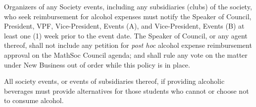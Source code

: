 Organizers of any Society events, including any subsidiaries (clubs) of the society,  who seek reimbursement for alcohol expenses must notify the Speaker of Council, President, VPF, Vice-President, Events (A), and Vice-President, Events (B) at least one (1) week prior to the event date. The Speaker of Council, or any agent thereof, shall not include any petition for \textit{post hoc} alcohol expense reimbursement approval on the MathSoc Council agenda; and shall rule any vote on the matter under New Business out of order while this policy is in place. 

All society events, or events of subsidiaries thereof, if providing alcoholic beverages must provide alternatives for those students who cannot or choose not to consume alcohol.
